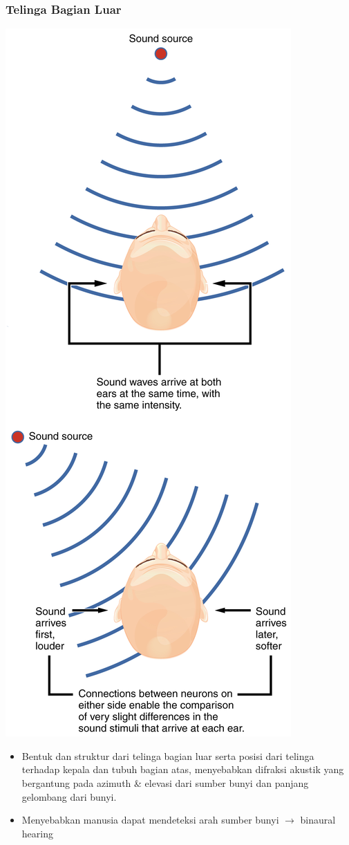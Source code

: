 \documentclass[pdflatex,compress]{beamer}
\begin{document}
\begin{frame}
	\frametitle{Telinga Bagian Luar}
	\begin{multicols}{2}
		\begin{center}
			\includegraphics[height=0.9\textheight]{img/img016}
		\end{center}
		\columnbreak
		\begin{itemize}
			\item Bentuk dan struktur dari telinga bagian luar serta posisi dari telinga terhadap kepala dan tubuh bagian atas, menyebabkan difraksi akustik yang bergantung pada azimuth \& elevasi dari sumber bunyi dan panjang gelombang dari bunyi.
			\item Menyebabkan manusia dapat mendeteksi arah sumber bunyi $\rightarrow$ binaural hearing
		\end{itemize}
	\end{multicols}
\end{frame}
\end{document}
